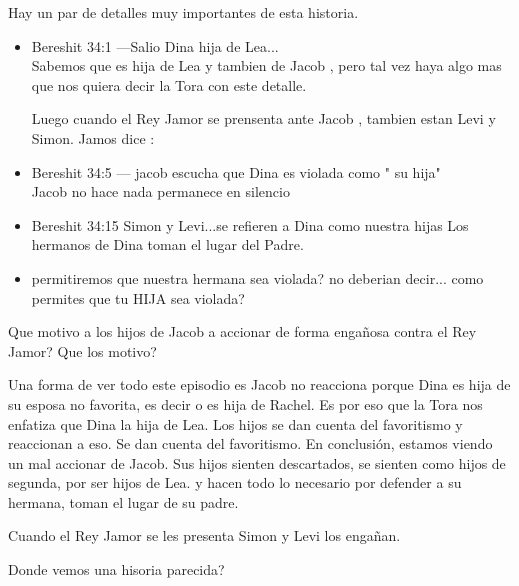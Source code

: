 \documentclass[conference]{IEEEtran}
\begin{document}
Hay un par de  detalles muy importantes de esta historia.

\begin{itemize}
\item
Bereshit 34:1  ---Salio Dina hija de Lea...\\
Sabemos que es hija de Lea y tambien de Jacob , pero tal vez haya algo mas que nos quiera decir la Tora con este detalle.

Luego cuando el Rey Jamor se prensenta ante Jacob , tambien estan Levi y Simon. 
Jamos dice :
 
\item
Bereshit 34:5 --- jacob escucha que Dina es violada como " su hija" \\
Jacob no hace nada permanece en silencio

\item Bereshit 34:15
Simon y Levi...se refieren a Dina como nuestra hijas
Los hermanos de Dina toman el lugar del Padre.



\item 
permitiremos  que nuestra hermana sea violada?
no deberian decir... como permites que tu HIJA sea violada?

\end{itemize}


Que motivo a los hijos de Jacob a accionar de forma engañosa contra el Rey Jamor?
Que los motivo?

Una forma de ver todo este episodio es Jacob no reacciona porque Dina es hija de su esposa no favorita, es decir o es hija de Rachel. Es por eso que la Tora nos enfatiza que Dina la hija de Lea.
Los hijos se dan cuenta del favoritismo y reaccionan a eso.
Se dan cuenta del favoritismo.
En conclusión, estamos viendo un mal accionar de Jacob. 
Sus hijos sienten descartados, se sienten como hijos de segunda, por ser hijos de Lea.
y hacen todo lo necesario por defender a su hermana, toman el lugar de su padre. 

Cuando el Rey Jamor se les presenta Simon y Levi los engañan.

Donde vemos una hisoria parecida?
\end{document}
